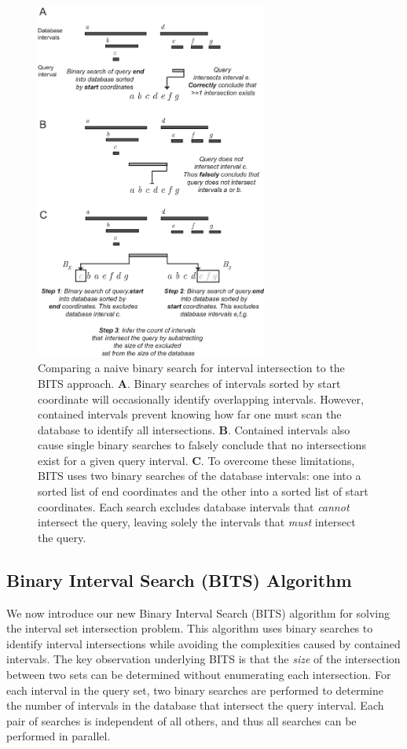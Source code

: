 \documentclass{bioinfo}
\begin{document}
\begin{figure}[h]
		\centering
		\includegraphics[width=3in]{Figure1.v3.eps}
		\caption{Comparing a naive binary search for interval 
		intersection to the BITS approach. \textbf{A}. Binary
		searches of intervals sorted by start coordinate will
		occasionally identify overlapping intervals. However,  
		contained intervals prevent knowing how far one must scan 
		the database to identify all intersections. \textbf{B}. Contained 
		intervals also cause single binary searches to 
		falsely conclude that no intersections exist for a given query 
		interval.  \textbf{C}. To overcome these limitations, BITS
		uses two binary searches of the database intervals: one
		into a sorted list of end coordinates and the other into a
		sorted list of start coordinates. Each search excludes database
		intervals that \emph{cannot} intersect the query, leaving solely the
		intervals that \emph{must} intersect the query.}
		\label{bitssearching}
\end{figure}

\subsection{Binary Interval Search (BITS) Algorithm}
We now introduce our new Binary Interval Search (BITS) algorithm for solving the
interval set intersection problem.  This algorithm uses binary searches to
identify interval intersections while avoiding the complexities
caused by contained intervals. The key observation underlying BITS 
is that the \emph{size} of the intersection between two sets can be determined
without enumerating each intersection.  For each interval in the query set, two
binary searches are performed to determine the number of intervals in the
database that intersect the query interval.  Each pair of searches is
independent of all others, and thus all searches can be performed in parallel.  
\end{document}
